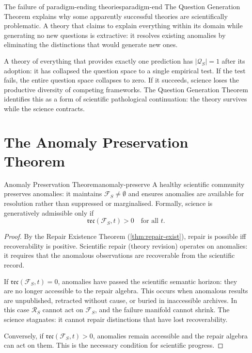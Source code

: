 \documentclass[12pt,twoside,openright]{book}
\newcommand{\reco}{\mathfrak{rec}}
\begin{document}
\begin{remark}{The failure of paradigm-ending theories}{paradigm-end}
  The Question Generation Theorem explains why some
  apparently successful theories are scientifically
  problematic. A theory that claims to explain
  everything within its domain while generating no
  new questions is extractive: it resolves existing
  anomalies by eliminating the distinctions that
  would generate new ones.

  A theory of everything that provides exactly one
  prediction has $|\mathcal{Q}_S| = 1$ after
  its adoption: it has collapsed the question space
  to a single empirical test. If the test fails,
  the entire question space collapses to zero.
  If it succeeds, science loses the productive
  diversity of competing frameworks.
  The Question Generation Theorem identifies this
  as a form of scientific pathological continuation:
  the theory survives while the science contracts.
\end{remark}

\section{The Anomaly Preservation Theorem}

\begin{theorem}{Anomaly Preservation Theorem}{anomaly-preserve}
  A healthy scientific community preserves anomalies:
  it maintains $\mathcal{F}_S \ne \emptyset$
  and ensures anomalies are available for resolution
  rather than suppressed or marginalised.
  Formally, science is generatively admissible only if
  \[
    \reco(\mathcal{F}_S, t) > 0
    \quad\text{for all } t.
  \]
\end{theorem}

\begin{proof}
  By the Repair Existence Theorem
  (\cref{thm:repair-exist}), repair is possible iff
  recoverability is positive. Scientific repair
  (theory revision) operates on anomalies: it requires
  that the anomalous observations are recoverable from
  the scientific record.

  If $\reco(\mathcal{F}_S, t) = 0$, anomalies have
  passed the scientific semantic horizon: they are
  no longer accessible to the repair algebra.
  This occurs when anomalous results are unpublished,
  retracted without cause, or buried in inaccessible
  archives.
  In this case $\mathcal{R}_S$ cannot act on
  $\mathcal{F}_S$, and the failure manifold cannot shrink.
  The science stagnates: it cannot repair distinctions
  that have lost recoverability.

  Conversely, if $\reco(\mathcal{F}_S, t) > 0$,
  anomalies remain accessible and the repair algebra
  can act on them. This is the necessary condition for
  scientific progress.
\end{proof}
\end{document}
